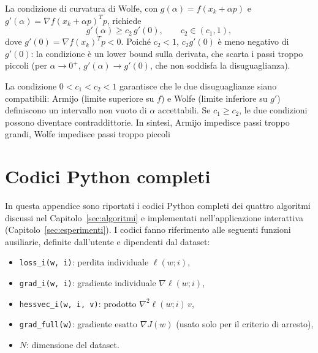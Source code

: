 \documentclass[a4paper,12pt]{article}
\numberwithin{equation}{section}
\numberwithin{figure}{section}
\numberwithin{table}{section}
\begin{document}
La condizione di curvatura di Wolfe, con $g(\alpha)=f(x_k+\alpha p)$ e $g'(\alpha)=\nabla f(x_k+\alpha p)^Tp$, richiede
\[
g'(\alpha) \ge c_2 \, g'(0), \qquad c_2 \in (c_1,1),
\]
dove $g'(0)=\nabla f(x_k)^Tp<0$. Poiché $c_2<1$, $c_2g'(0)$ è meno negativo di $g'(0)$: la condizione è un lower bound sulla derivata, che scarta i passi troppo piccoli (per $\alpha\to0^+$, $g'(\alpha)\to g'(0)$, che non soddisfa la disuguaglianza).

La condizione $0<c_1<c_2<1$ garantisce che le due disuguaglianze siano compatibili: Armijo (limite superiore su $f$) e Wolfe (limite inferiore su $g'$) definiscono un intervallo non vuoto di $\alpha$ accettabili. Se $c_1\ge c_2$, le due condizioni possono diventare contraddittorie. In sintesi, Armijo impedisce passi troppo grandi, Wolfe impedisce passi troppo piccoli

\section{Codici Python completi}\label{app:codici}

In questa appendice sono riportati i codici Python completi dei quattro
algoritmi discussi nel Capitolo~\ref{sec:algoritmi} e implementati
nell'applicazione interattiva (Capitolo~\ref{sec:esperimenti}). I codici fanno riferimento alle
seguenti funzioni ausiliarie, definite dall'utente e dipendenti dal dataset:

\begin{itemize}
  \item \texttt{loss\_i(w, i)}: perdita individuale $\ell(w;i)$,
  \item \texttt{grad\_i(w, i)}: gradiente individuale $\nabla\ell(w;i)$,
  \item \texttt{hessvec\_i(w, i, v)}: prodotto $\nabla^2\ell(w;i)\,v$,
  \item \texttt{grad\_full(w)}: gradiente esatto $\nabla J(w)$ (usato solo per
  il criterio di arresto),
  \item $N$: dimensione del dataset.
\end{itemize}
\end{document}
